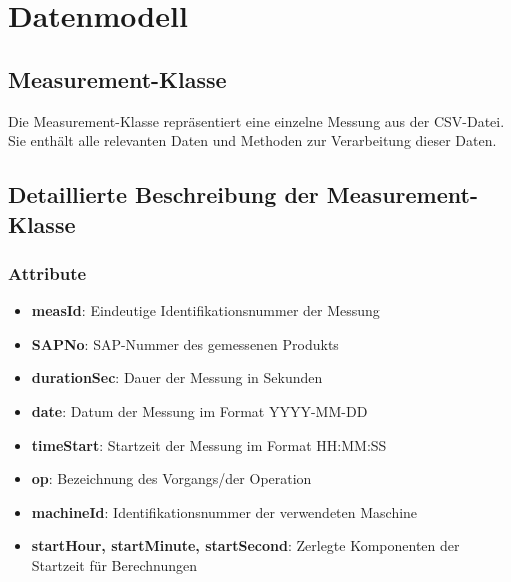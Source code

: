 \documentclass[a4paper,11pt]{article}
\begin{document}
\section{Datenmodell}

\subsection{Measurement-Klasse}
Die Measurement-Klasse repräsentiert eine einzelne Messung aus der CSV-Datei. Sie enthält alle relevanten Daten und Methoden zur Verarbeitung dieser Daten.

\begin{center}
\end{center}

\subsection{Detaillierte Beschreibung der Measurement-Klasse}

\subsubsection{Attribute}
\begin{itemize}
    \item \textbf{measId}: Eindeutige Identifikationsnummer der Messung
    \item \textbf{SAPNo}: SAP-Nummer des gemessenen Produkts
    \item \textbf{durationSec}: Dauer der Messung in Sekunden
    \item \textbf{date}: Datum der Messung im Format YYYY-MM-DD
    \item \textbf{timeStart}: Startzeit der Messung im Format HH:MM:SS
    \item \textbf{op}: Bezeichnung des Vorgangs/der Operation
    \item \textbf{machineId}: Identifikationsnummer der verwendeten Maschine
    \item \textbf{startHour, startMinute, startSecond}: Zerlegte Komponenten der Startzeit für Berechnungen
\end{itemize}
\end{document}
